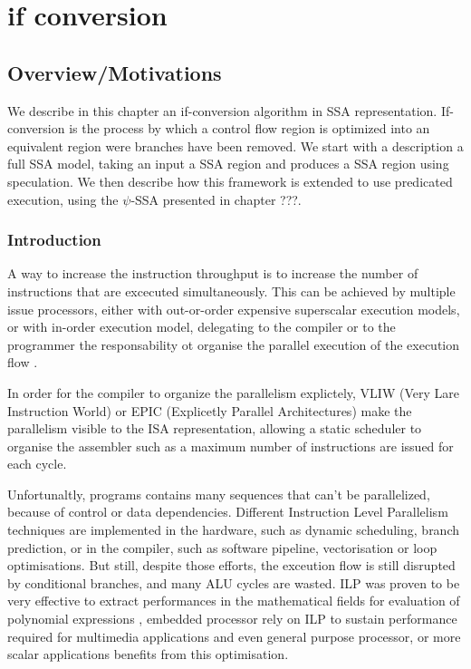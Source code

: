 \chapter{if conversion }
\graphicspath{{img/}{if_conversion/img/}{part4/if_conversion/img/}}
	
\newcommand\cond{~?~}


\section{Overview/Motivations}

We describe in this chapter an if-conversion algorithm in SSA representation. If-conversion is the process by which a control flow region is optimized into an equivalent region were branches have been removed. We start with a description a full SSA model, taking an input a SSA region and produces a SSA region using speculation. We then describe how this framework is extended to use predicated execution, using the $\psi$-SSA presented in chapter ???. 

\subsection{Introduction}

A way to increase the instruction throughput is to increase the number of instructions that are excecuted simultaneously. This can be achieved by multiple issue processors, either with out-or-order expensive superscalar execution models, or with in-order execution model, delegating to the compiler or to the programmer the responsability ot organise the parallel execution of the execution flow \cite{Rau:2003:IP:1074100.1074489}.

In order for the compiler to organize the parallelism explictely, VLIW (Very Lare Instruction World) or EPIC (Explicetly Parallel Architectures) make the parallelism visible to the ISA representation, allowing a static scheduler to organise the assembler such as a maximum number of instructions are issued for each cycle. 

Unfortunaltly, programs contains many sequences that can't be parallelized, because of control or data dependencies. Different Instruction Level Parallelism techniques are implemented in the hardware, such as dynamic scheduling, branch prediction, or in the compiler, such as software pipeline, vectorisation or loop optimisations. But still, despite those efforts, the exceution flow is still disrupted by conditional branches, and many ALU cycles are wasted. ILP was proven to be very effective to extract performances in the mathematical fields for evaluation of polynomial expressions \cite{Jeannerod:2010:TTI:1837210.1837212}, embedded processor rely on ILP to sustain performance required for multimedia applications \cite{FisherFaraboshiYoung} and even general purpose processor, or more scalar applications benefits from this optimisation.

